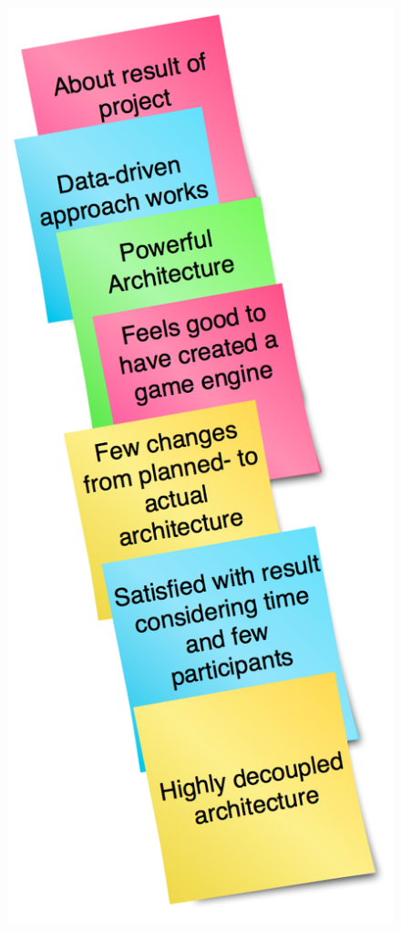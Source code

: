 \documentclass[titlepage,a4paper,11pt]{article}
\begin{document}
\begin{figure}[H]
    \begin{minipage}[b]{0.5\linewidth}
        \centering
\includegraphics[scale=0.4]{graphics/postit/POS_about_result_of_project}

\end{minipage}
\end{figure}
\end{document}
